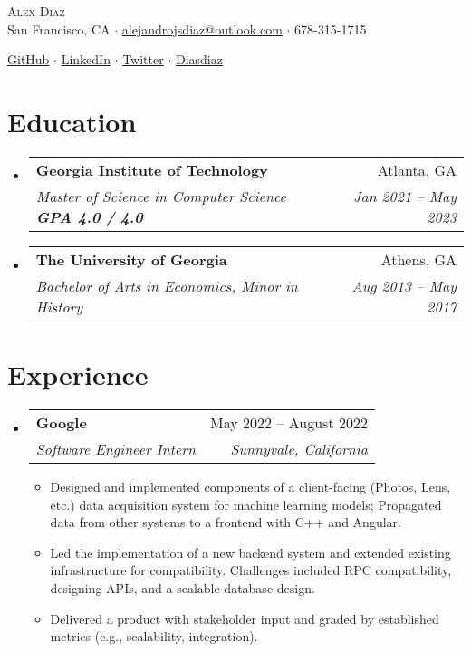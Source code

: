 \documentclass[12pt, letter]{article}
\makeatletter
\newcommand{\resumeItem}[1]{
  \item\small{
    {#1 \vspace{-2pt}}
  }
}
\newcommand{\resumeSubheading}[4]{
  \vspace{-2pt}\item
    \begin{tabular*}{0.97\textwidth}[t]{l@{\extracolsep{\fill}}r}
      \textbf{#1} & #2 \\
      \textit{\small#3} & \textit{\small #4} \\
    \end{tabular*}\vspace{-7pt}
}
\newcommand{\resumeSubHeadingListStart}{\begin{itemize}[leftmargin=0.15in, label={}]}
\newcommand{\resumeSubHeadingListEnd}{\end{itemize}}
\newcommand{\resumeItemListStart}{\begin{itemize}[noitemsep]} %
\newcommand{\resumeItemListEnd}{\end{itemize}\vspace{-16pt}}
\makeatother
\begin{document}
    

\vspace*{-14pt}
\begin{center}
	{\Huge \scshape {Alex Diaz}}\\
	\vspace{1mm}
	\faMapMarker \hspace{.5mm} San Francisco, CA $\cdot$ 
	\faEnvelope \hspace{.5mm} \href{mailto:alejandrojsdiaz@outlook.com}{alejandrojsdiaz@outlook.com} $\cdot$ \faMobile \hspace{.5mm} 678-315-1715
		
	\faGithub \hspace{.5mm} \href{https://github.com/calmcoconut}{GitHub} $\cdot$
	\faLinkedin \hspace{.5mm} \href{https://www.linkedin.com/in/diazjalejandro/}{LinkedIn} $\cdot$
	\faTwitter \hspace{.5mm} \href{https://twitter.com/greetingsfriend}{Twitter} $\cdot$
    \faBriefcase \hspace{.5mm} \href{https://calmcoconut.github.io/diasDiaz/}{Diasdiaz}
    \\
\end{center}

\vspace{-14pt}
\section{Education}
  \resumeSubHeadingListStart
    \resumeSubheading
      {Georgia Institute of Technology}{Atlanta, GA}
      {Master of Science in Computer Science \textbf{GPA 4.0 / 4.0}}{Jan 2021 -- May 2023}
    \resumeSubheading
      {The University of Georgia}{Athens, GA}
      {Bachelor of Arts in Economics, Minor in History}{Aug 2013 -- May 2017}
 \resumeSubHeadingListEnd


\section{Experience}

\resumeSubHeadingListStart
  \resumeSubheading
    {Google}{May 2022 -- August 2022}
    {Software Engineer Intern}{Sunnyvale, California}
    \resumeItemListStart
      \resumeItem{Designed and implemented components of a client-facing (Photos, Lens, etc.) data acquisition system for machine learning models; Propagated data from other systems to a frontend with C++ and Angular.}
      \resumeItem{Led the implementation of a new backend system and extended existing infrastructure for compatibility. Challenges included RPC compatibility, designing APIs, and a scalable database design.}
      \resumeItem{Delivered a product with stakeholder input and graded by established metrics (e.g., scalability, integration).}
    \resumeItemListEnd
  \resumeSubHeadingListEnd
\end{document}
